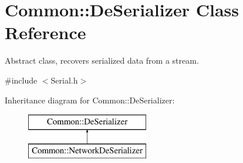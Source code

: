 \hypertarget{class_common_1_1_de_serializer}{\section{Common\-:\-:De\-Serializer Class Reference}
\label{class_common_1_1_de_serializer}
}


Abstract class, recovers serialized data from a stream.  




{\ttfamily \#include $<$Serial.\-h$>$}

Inheritance diagram for Common\-:\-:De\-Serializer\-:\begin{figure}[H]
\begin{center}
\leavevmode
\includegraphics[height=2.000000cm]{class_common_1_1_de_serializer}
\end{center}
\end{figure}
